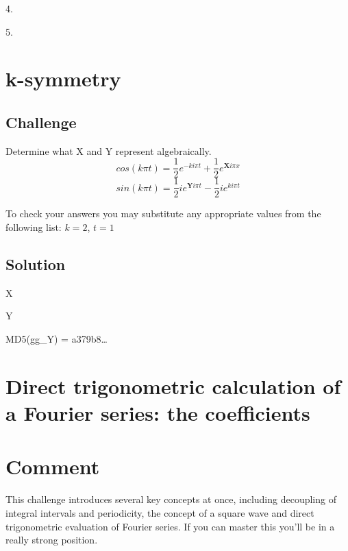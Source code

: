 4. 

5. 

\timebox




\newpage
\section{k-symmetry}

\subsection*{Challenge}
Determine what X and Y represent algebraically.
\begin{equation}
    cos(k \pi t) = \frac{1}{2} e^{-k i\pi t} + \frac{1}{2} e^{\bm{X} i \pi x}
\end{equation}
\begin{equation}
    sin(k \pi t) = \frac{1}{2} i e^{\bm{Y} i \pi t} - \frac{1}{2} i e^{k i \pi t}
\end{equation}

To check your answers you may substitute any appropriate values from the following list: $k=2$, $t=1$

\subsection*{Solution}
X


Y

MD5(gg\_Y) = a379b8\ldots

\timebox




\newpage
\section{Direct trigonometric calculation of a Fourier series: the coefficients}
\label{sec:fs_squarewave}

\section*{Comment}
This challenge introduces several key concepts at once, including decoupling of integral intervals and periodicity, the concept of a square wave and direct trigonometric evaluation of Fourier series. If you can master this you'll be in a really strong position.

